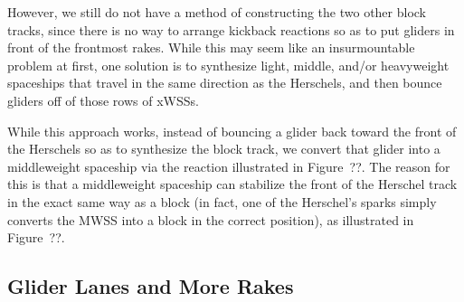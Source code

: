 However, we still do not have a method of constructing the two other block tracks, since there is no way to arrange kickback reactions so as to put gliders in front of the frontmost rakes. While this may seem like an insurmountable problem at first, one solution is to synthesize light, middle, and/or heavyweight spaceships that travel in the same direction as the Herschels, and then bounce gliders off of those rows of xWSSs.

While this approach works, instead of bouncing a glider back toward the front of the Herschels so as to synthesize the block track, we convert that glider into a middleweight spaceship via the reaction illustrated in Figure~??. The reason for this is that a middleweight spaceship can stabilize the front of the Herschel track in the exact same way as a block (in fact, one of the Herschel's sparks simply converts the MWSS into a block in the correct position), as illustrated in Figure~??.



%
%



\subsection{Glider Lanes and More Rakes}\label{sec:silverfish_more_rakes}

